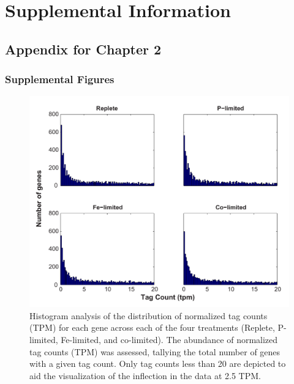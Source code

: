 \chapter{Supplemental Information}




\section{Appendix for Chapter 2}

\subsection{Supplemental Figures}
\begin{figure}[h!]
  \centering
    \includegraphics[width=1\textwidth]{Images/C2_FigureS1_v6.pdf}
    \caption[Distribution of normalized tag counts across treatments]{Histogram analysis of the distribution of normalized tag counts (TPM) for each gene across each of the four treatments (Replete, P-limited, Fe-limited, and co-limited). The abundance of normalized tag counts (TPM) was assessed, tallying the total number of genes with a given tag count. Only tag counts less than 20 are depicted to aid the visualization of the inflection in the data at 2.5 TPM.}
  \label{fig:a1f1}
\end{figure}

